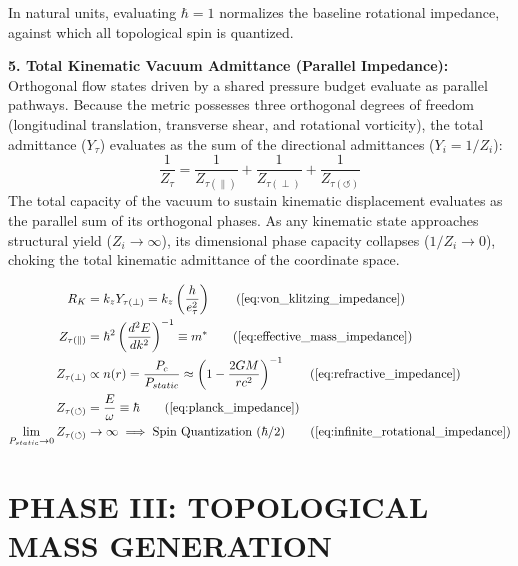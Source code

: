 In natural units, evaluating $\hbar = 1$ normalizes the baseline rotational impedance, against which all topological spin is quantized.
\vspace{0.2 cm}

\textbf{5. Total Kinematic Vacuum Admittance (Parallel Impedance):} \\
Orthogonal flow states driven by a shared pressure budget evaluate as parallel pathways. Because the metric possesses three orthogonal degrees of freedom (longitudinal translation, transverse shear, and rotational vorticity), the total admittance ($Y_\tau$) evaluates as the sum of the directional admittances ($Y_i = 1/Z_i$): 
\begin{equation}
    \frac{1}{Z_\tau} = \frac{1}{Z_{\tau(\parallel)}} + \frac{1}{Z_{\tau(\perp)}} + \frac{1}{Z_{\tau(\circlearrowleft)}} \label{eq:parallel_impedance}
\end{equation}
The total capacity of the vacuum to sustain kinematic displacement evaluates as the parallel sum of its orthogonal phases. As any kinematic state approaches structural yield ($Z_i \to \infty$), its dimensional phase capacity collapses ($1/Z_i \to 0$), choking the total kinematic admittance of the coordinate space.

\begin{tcolorbox}[recallbox, title={\ref{box:universal_impedance}. Universal Kinematic Vacuum Impedance ($Z_{\tau}$)}]
\begin{align}
    R_K &= k_z Y_{\tau(\perp)} = k_z \left(\frac{h}{e_\tau^2}\right) \tag{\ref{eq:von_klitzing_impedance}} \\
    Z_{\tau(\parallel)} &= \hbar^2 \left( \frac{d^2 E}{dk^2} \right)^{-1} \equiv m^* \tag{\ref{eq:effective_mass_impedance}} \\
    Z_{\tau(\perp)} &\propto n(r) = \frac{P_c}{P_{static}} \approx \left( 1 - \frac{2GM}{rc^2} \right)^{-1} \tag{\ref{eq:refractive_impedance}} \\
    Z_{\tau(\circlearrowleft)} &= \frac{E}{\omega} \equiv \hbar \tag{\ref{eq:planck_impedance}} \\
    \lim_{P_{static} \to 0} Z_{\tau(\circlearrowleft)} &\to \infty \implies \text{Spin Quantization } (\hbar/2) \tag{\ref{eq:infinite_rotational_impedance}}
\end{align}
\end{tcolorbox}

\vspace{0.2 cm}

\part*{PHASE III: TOPOLOGICAL MASS GENERATION}

